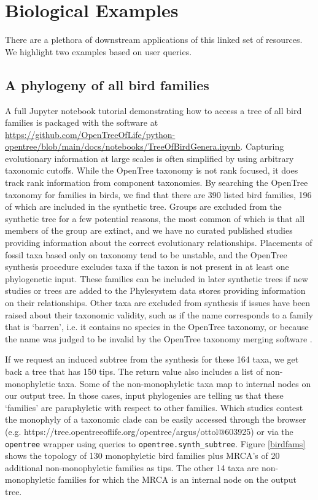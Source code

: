\documentclass[oupdraft]{sysbio_sse}
\begin{document}
\bigskip

\section{Biological Examples}
\label{sec4}

There are a plethora of downstream applications of this linked set of resources.
We highlight two examples based on user queries.


\subsection{A phylogeny of all bird families}
A full Jupyter notebook tutorial demonstrating how to access a tree of all bird families is packaged with the software at \url{https://github.com/OpenTreeOfLife/python-opentree/blob/main/docs/notebooks/TreeOfBirdGenera.ipynb}.
Capturing evolutionary information at large scales is often simplified by using arbitrary taxonomic cutoffs.
While the OpenTree taxonomy is not rank focused, it does track rank information from component taxonomies.
By searching the OpenTree taxonomy for families in birds, we find that there are 390 listed bird families, 196 of which are included in the synthetic tree.
Groups are excluded from the synthetic tree for a few potential reasons, the most common of which is that all members of the group are extinct, and we have no curated published studies providing information about the correct evolutionary relationships.
Placements of fossil taxa based only on taxonomy tend to be unstable, and the OpenTree synthesis procedure excludes taxa if the taxon is not present in at least one  phylogenetic input.
These families can be included in later synthetic trees if new studies or trees are added to the Phylesystem data stores providing information on their relationships.
Other taxa are excluded from synthesis if issues have been raised about their taxonomic validity, such as if the name corresponds to a family that is `barren', i.e. it contains no species in the OpenTree taxonomy, or because the name was judged to be invalid by the OpenTree taxonomy merging software \citep{rees_automated_2017}.

If we request an induced subtree from the synthesis for these 164 taxa, we get back a tree that has 150 tips. The return value also includes a list of non-monophyletic taxa.
Some of the non-monophyletic taxa map to internal nodes on our output tree. In those cases, input phylogenies are telling us that these `families' are paraphyletic with respect to other families. Which studies contest the monophyly of a taxonomic clade can be easily accessed through the browser (e.g. https://tree.opentreeoflife.org/opentree/argus/ottol@603925) or via the \texttt{opentree} wrapper using queries to \texttt{opentree.synth\_subtree}. Figure \ref{birdfams} shows the topology of 130 monophyletic bird families plus MRCA's of 20 additional non-monophyletic families as tips. The other 14 taxa are non-monophyletic families for which the MRCA is an internal node on the output tree.
\end{document}
